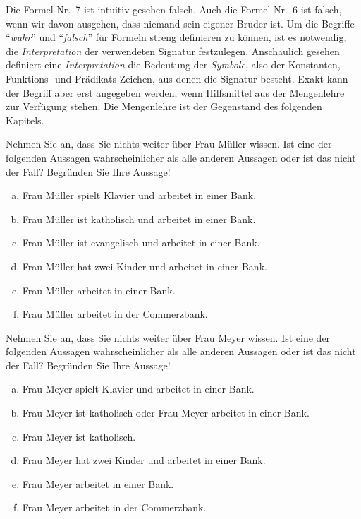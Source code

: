 Die Formel Nr.~7 ist intuitiv gesehen falsch. 
Auch die Formel Nr.~6 ist falsch, wenn wir davon ausgehen, dass niemand sein eigener
Bruder ist.
Um die Begriffe ``\emph{wahr}'' und ``\emph{falsch}'' f\"ur Formeln streng definieren zu k\"onnen,
ist es notwendig, die \emph{Interpretation} der verwendeten Signatur festzulegen. 
Anschaulich gesehen definiert eine \emph{Interpretation} die Bedeutung der \emph{Symbole},
also der Konstanten, Funktions- und Pr\"adikats-Zeichen, aus denen die Signatur besteht.
Exakt kann der Begriff aber erst angegeben werden, wenn Hilfsmittel aus der Mengenlehre
zur Verf\"ugung stehen.  Die Mengenlehre ist der Gegenstand des folgenden Kapitels.

\exercise
Nehmen Sie an, dass Sie nichts weiter \"uber Frau M\"uller wissen.  Ist eine der folgenden Aussagen
wahrscheinlicher als alle anderen Aussagen oder ist das nicht der Fall?  Begr\"unden Sie Ihre Aussage!
\begin{enumerate}[(a)]
\item Frau M\"uller spielt Klavier und arbeitet in einer Bank.
\item Frau M\"uller ist katholisch und arbeitet in einer Bank.
\item Frau M\"uller ist evangelisch und arbeitet in einer Bank.
\item Frau M\"uller hat zwei Kinder und arbeitet in einer Bank.
\item Frau M\"uller arbeitet in einer Bank.
\item Frau M\"uller arbeitet in der Commerzbank. \eox
\end{enumerate}

\exercise
Nehmen Sie an, dass Sie nichts weiter \"uber Frau Meyer wissen.  Ist eine der folgenden Aussagen
wahrscheinlicher als alle anderen Aussagen oder ist das nicht der Fall?  Begr\"unden Sie Ihre Aussage!
\begin{enumerate}[(a)]
\item Frau Meyer spielt Klavier und arbeitet in einer Bank.
\item Frau Meyer ist katholisch oder Frau Meyer arbeitet in einer Bank.
\item Frau Meyer ist katholisch.
\item Frau Meyer hat zwei Kinder und arbeitet in einer Bank.
\item Frau Meyer arbeitet in einer Bank.
\item Frau Meyer arbeitet in der Commerzbank. \eox
\end{enumerate}


